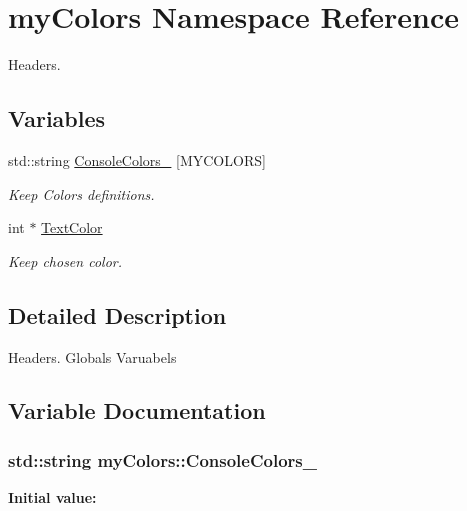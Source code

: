 \hypertarget{namespacemyColors}{
\section{myColors Namespace Reference}
\label{namespacemyColors}
}


Headers.  


\subsection*{Variables}
\begin{DoxyCompactItemize}
\item 
std::string \hyperlink{namespacemyColors_acd2740448dd52d14badb1864e14401ce}{ConsoleColors\_\-} \mbox{[}MYCOLORS\mbox{]}
\begin{DoxyCompactList}\small\item\em Keep Colors definitions. \item\end{DoxyCompactList}\item 
\hypertarget{namespacemyColors_a52b646aad549675b463b1b37c6be6145}{
int $\ast$ \hyperlink{namespacemyColors_a52b646aad549675b463b1b37c6be6145}{TextColor}}
\label{namespacemyColors_a52b646aad549675b463b1b37c6be6145}

\begin{DoxyCompactList}\small\item\em Keep chosen color. \item\end{DoxyCompactList}\end{DoxyCompactItemize}


\subsection{Detailed Description}
Headers. Globals Varuabels 

\subsection{Variable Documentation}
\hypertarget{namespacemyColors_acd2740448dd52d14badb1864e14401ce}{
\subsubsection[{ConsoleColors\_\-}]{\setlength{\rightskip}{0pt plus 5cm}std::string {\bf myColors::ConsoleColors\_\-}}}
\label{namespacemyColors_acd2740448dd52d14badb1864e14401ce}
{\bfseries Initial value:}

